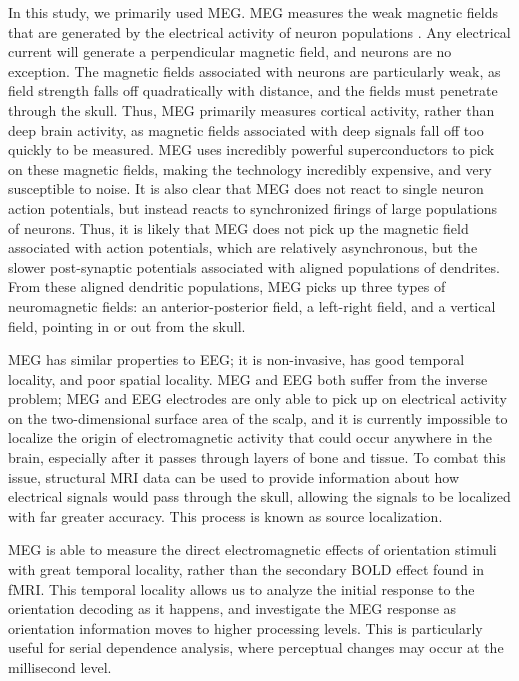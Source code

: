 \documentclass[../main.tex]{subfiles}
\begin{document}
In this study, we primarily used MEG. MEG measures the weak magnetic fields that are generated by the electrical activity of neuron populations \citep{senior_russell_gazzaniga_2006}. Any electrical current will generate a perpendicular magnetic field, and neurons are no exception. The magnetic fields associated with neurons are particularly weak, as field strength falls off quadratically with distance, and the fields must penetrate through the skull. Thus, MEG primarily measures cortical activity, rather than deep brain activity, as magnetic fields associated with deep signals fall off too quickly to be measured. MEG uses incredibly powerful superconductors to pick on these magnetic fields, making the technology incredibly expensive, and very susceptible to noise. It is also clear that MEG does not react to single neuron action potentials, but instead reacts to synchronized firings of large populations of neurons. Thus, it is likely that MEG does not pick up the magnetic field associated with action potentials, which are relatively asynchronous, but the slower post-synaptic potentials associated with aligned populations of dendrites. From these aligned dendritic populations, MEG picks up three types of neuromagnetic fields: an anterior-posterior field, a left-right field, and a vertical field, pointing in or out from the skull.

MEG has similar properties to EEG; it is non-invasive, has good temporal locality, and poor spatial locality. MEG and EEG both suffer from the inverse problem; MEG and EEG electrodes are only able to pick up on electrical activity on the two-dimensional surface area of the scalp, and it is currently impossible to localize the origin of electromagnetic activity that could occur anywhere in the brain, especially after it passes through layers of bone and tissue. To combat this issue, structural MRI data can be used to provide information about how electrical signals would pass through the skull, allowing the signals to be localized with far greater accuracy. This process is known as source localization.

MEG is able to measure the direct electromagnetic effects of orientation stimuli with great temporal locality, rather than the secondary BOLD effect found in fMRI. This temporal locality allows us to analyze the initial response to the orientation decoding as it happens, and investigate the MEG response as orientation information moves to higher processing levels. This is particularly useful for serial dependence analysis, where perceptual changes may occur at the millisecond level. 
\end{document}
